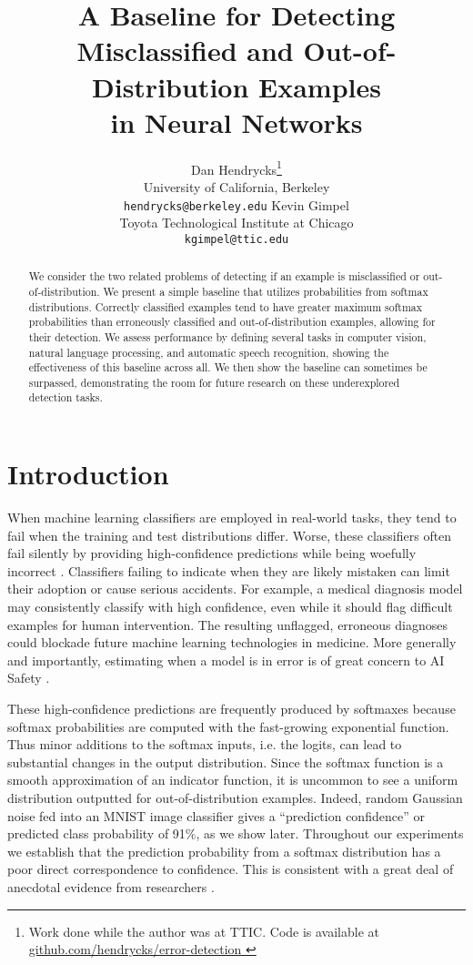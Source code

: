 \documentclass{article}
\title{A Baseline for Detecting Misclassified and Out-of-Distribution Examples\\ in Neural Networks}
\author{Dan Hendrycks\thanks{Work done while the author was at TTIC. Code is available at \href{https://github.com/hendrycks/error-detection
}{github.com/hendrycks/error-detection
} }\\University of California, Berkeley\\\texttt{hendrycks@berkeley.edu} \And Kevin Gimpel\\ Toyota Technological Institute at Chicago\\\texttt{kgimpel@ttic.edu}}
\begin{document}
\date{}
\maketitle
\begin{abstract}
We consider the two related problems of detecting if an example is misclassified or out-of-distribution. We present a simple baseline that utilizes probabilities from softmax distributions. Correctly classified examples tend to have greater maximum softmax probabilities than erroneously classified and out-of-distribution examples, allowing for their detection. We assess performance by defining several tasks in computer vision, natural language processing, and automatic speech recognition, showing the effectiveness of this baseline across all. We then show the baseline can sometimes be surpassed, demonstrating the room for future research on these underexplored detection tasks.
\end{abstract}

\section{Introduction}
When machine learning classifiers are employed in real-world tasks, they tend to fail when the training and test distributions differ. Worse, these classifiers often fail silently by providing high-confidence predictions while being woefully incorrect \citep{goodfellow, colah}. Classifiers failing to indicate when they are likely mistaken can limit their adoption or cause serious accidents. For example, a medical diagnosis model may consistently classify with high confidence, even while it should flag difficult examples for human intervention. The resulting unflagged, erroneous diagnoses could blockade future machine learning technologies in medicine. More generally and importantly, estimating when a model is in error is of great concern to AI Safety \citep{colah}.

These high-confidence predictions are frequently produced by softmaxes because softmax probabilities are computed with the fast-growing exponential function. Thus minor additions to the softmax inputs, i.e. the logits, can lead to substantial changes in the output distribution. Since the softmax function is a smooth approximation of an indicator function, it is uncommon to see a uniform distribution outputted for out-of-distribution examples. Indeed, random Gaussian noise fed into an MNIST image classifier gives a ``prediction confidence'' or predicted class probability of 91\%, as we show later. Throughout our experiments we establish that the prediction probability from a softmax distribution has a poor direct correspondence to confidence. This is consistent with a great deal of anecdotal evidence from researchers \citep{nguyen,yu,provost,foolers}.
\end{document}
